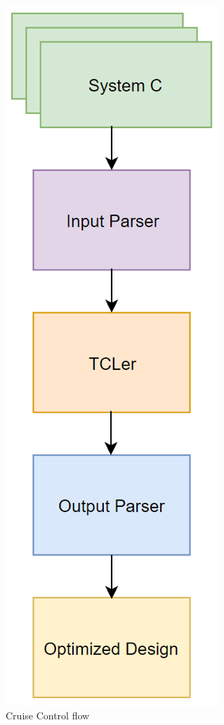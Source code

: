 \documentclass[letterpaper, 10 pt, conference]{IEEEconf}  %
\begin{document}
\begin{figure}[H]
\centering
\includegraphics[scale=.6]{CC_flow.png} 
\caption{Cruise Control  flow}
\end{figure}
\end{document}
